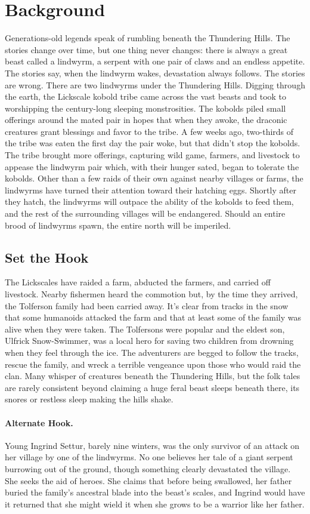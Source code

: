 \documentclass[10pt,a4paper,twoside,twocolumn,openany,bg=print,nodeprecatedcode]{dndbook}
\begin{document}
\section{Background}
Generations-old legends speak of rumbling beneath the Thundering Hills. The stories change over time, but one thing never changes: there is always a great beast called a lindwyrm, a serpent with one pair of claws and an endless appetite. The stories say, when the lindwyrm wakes, devastation always follows. The stories are wrong. There are two lindwyrms under the Thundering Hills.
Digging through the earth, the Lickscale kobold tribe came across the vast beasts and took to worshipping the century-long sleeping monstrosities. The kobolds piled small offerings around the mated pair in hopes that when they awoke, the draconic creatures grant blessings and favor to the tribe. A few weeks ago, two-thirds of the tribe was eaten the first day the pair woke, but that didn't stop the kobolds. The tribe brought more offerings, capturing wild game, farmers, and livestock to appease the lindwyrm pair which, with their hunger sated, began to tolerate the kobolds. Other than a few raids of their own against nearby villages or farms, the lindwyrms have turned their attention toward their hatching eggs. Shortly after they hatch, the lindwyrms will outpace the ability of the kobolds to feed them, and the rest of the surrounding villages will be endangered. Should an entire brood of lindwyrms spawn, the entire north will be imperiled.
\subsection{Set the Hook}
The Lickscales have raided a farm, abducted the farmers, and carried off livestock. Nearby fishermen heard the commotion but, by the time they arrived, the Tolferson family had been carried away. It's clear from tracks in the snow that some humanoids attacked the farm and that at least some of the family was alive when they were taken. The Tolfersons were popular and the eldest son, Ulfrick Snow-Swimmer, was a local hero for saving two children from drowning when they feel through the ice. The adventurers are begged to follow the tracks, rescue the family, and wreck a terrible vengeance upon those who would raid the clan. Many whisper of creatures beneath the Thundering Hills, but the folk tales are rarely consistent beyond claiming a huge feral beast sleeps beneath there, its snores or restless sleep making the hills shake.
\paragraph{Alternate Hook.}
Young Ingrind Settur, barely nine winters, was the only survivor of an attack on her village by one of the lindwyrms. No one believes her tale of a giant serpent burrowing out of the ground, though something clearly devastated the village. She seeks the aid of heroes. She claims that before being swallowed, her father buried the family's ancestral blade into the beast's scales, and Ingrind would have it returned that she might wield it when she grows to be a warrior like her father.
\end{document}
